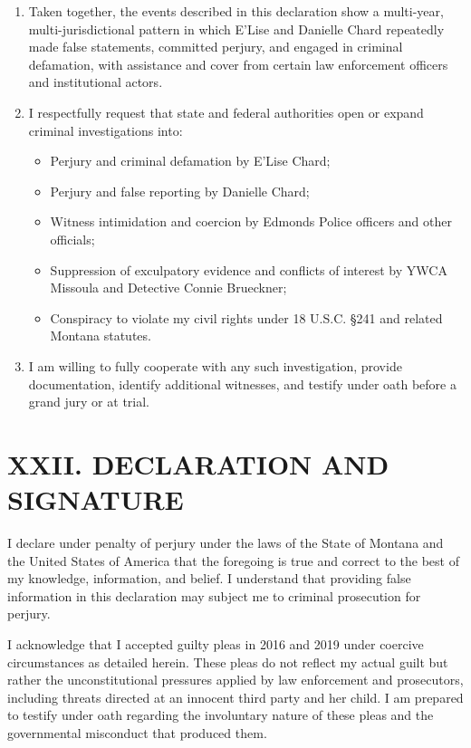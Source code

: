 \documentclass[12pt,letterpaper]{article}
\begin{document}
\begin{enumerate}

\item Taken together, the events described in this declaration show a multi-year, multi-jurisdictional pattern in which E'Lise and Danielle Chard repeatedly made false statements, committed perjury, and engaged in criminal defamation, with assistance and cover from certain law enforcement officers and institutional actors.

\item I respectfully request that state and federal authorities open or expand criminal investigations into:

\begin{itemize}
  \item Perjury and criminal defamation by E'Lise Chard;
  \item Perjury and false reporting by Danielle Chard;
  \item Witness intimidation and coercion by Edmonds Police officers and other officials;
  \item Suppression of exculpatory evidence and conflicts of interest by YWCA Missoula and Detective Connie Brueckner;
  \item Conspiracy to violate my civil rights under 18 U.S.C. \S 241 and related Montana statutes.
\end{itemize}

\item I am willing to fully cooperate with any such investigation, provide documentation, identify additional witnesses, and testify under oath before a grand jury or at trial.

\end{enumerate}

\section*{XXII. DECLARATION AND SIGNATURE}

I declare under penalty of perjury under the laws of the State of Montana and the United States of America that the foregoing is true and correct to the best of my knowledge, information, and belief. I understand that providing false information in this declaration may subject me to criminal prosecution for perjury.

I acknowledge that I accepted guilty pleas in 2016 and 2019 under coercive circumstances as detailed herein. These pleas do not reflect my actual guilt but rather the unconstitutional pressures applied by law enforcement and prosecutors, including threats directed at an innocent third party and her child. I am prepared to testify under oath regarding the involuntary nature of these pleas and the governmental misconduct that produced them.
\end{document}

